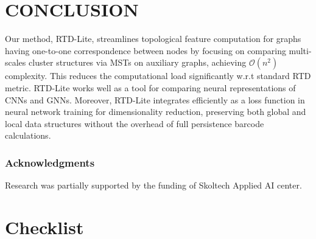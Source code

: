 \documentclass[twoside]{article}
\begin{document}
\section{CONCLUSION}
\label{sec:conclusion}

Our method, RTD-Lite, streamlines topological feature computation for graphs having one-to-one correspondence between nodes by focusing on comparing multi-scales cluster structures via MSTs on auxiliary graphs, achieving $\mathcal{O}(n^2)$ complexity. This reduces the computational load significantly w.r.t standard RTD metric.
RTD-Lite works well as a tool for comparing neural representations of CNNs and GNNs. Moreover, RTD-Lite integrates efficiently as a loss function in neural network training for dimensionality reduction, preserving both global and local data structures without the overhead of full persistence barcode calculations.


\subsubsection*{Acknowledgments}
Research was partially supported by the funding of Skoltech Applied AI center.



\clearpage

\section*{Checklist}
\end{document}
